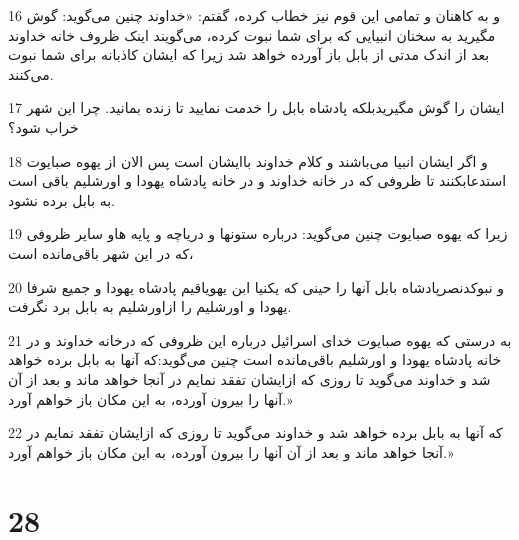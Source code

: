 \par 16 و به کاهنان و تمامی این قوم نیز خطاب کرده، گفتم: «خداوند چنین می‌گوید: گوش مگیرید به سخنان انبیایی که برای شما نبوت کرده، می‌گویند اینک ظروف خانه خداوند بعد از اندک مدتی از بابل باز آورده خواهد شد زیرا که ایشان کاذبانه برای شما نبوت می‌کنند.
\par 17 ایشان را گوش مگیریدبلکه پادشاه بابل را خدمت نمایید تا زنده بمانید. چرا این شهر خراب شود؟
\par 18 و اگر ایشان انبیا می‌باشند و کلام خداوند باایشان است پس الان از یهوه صبایوت استدعابکنند تا ظروفی که در خانه خداوند و در خانه پادشاه یهودا و اورشلیم باقی است به بابل برده نشود.
\par 19 زیرا که یهوه صبایوت چنین می‌گوید: درباره ستونها و دریاچه و پایه هاو سایر ظروفی که در این شهر باقی‌مانده است،
\par 20 و نبوکدنصرپادشاه بابل آنها را حینی که یکنیا ابن یهویاقیم پادشاه یهودا و جمیع شرفا یهودا و اورشلیم را ازاورشلیم به بابل برد نگرفت.
\par 21 به درستی که یهوه صبایوت خدای اسرائیل درباره این ظروفی که درخانه خداوند و در خانه پادشاه یهودا و اورشلیم باقی‌مانده است چنین می‌گوید:که آنها به بابل برده خواهد شد و خداوند می‌گوید تا روزی که ازایشان تفقد نمایم در آنجا خواهد ماند و بعد از آن آنها را بیرون آورده، به این مکان باز خواهم آورد.»
\par 22 که آنها به بابل برده خواهد شد و خداوند می‌گوید تا روزی که ازایشان تفقد نمایم در آنجا خواهد ماند و بعد از آن آنها را بیرون آورده، به این مکان باز خواهم آورد.»
 
\chapter{28}

